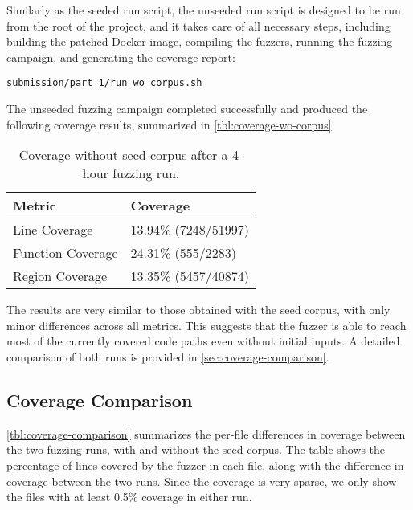 Similarly as the seeded run script, the unseeded run script is designed to be run from the root of the project, and it takes care of all necessary steps, including building the patched Docker image, compiling the fuzzers, running the fuzzing campaign, and generating the coverage report:

\begin{verbatim}
submission/part_1/run_wo_corpus.sh
\end{verbatim}

The unseeded fuzzing campaign completed successfully and produced the following coverage results, summarized in \autoref{tbl:coverage-wo-corpus}.

\begin{table}[ht]
	\centering
	\begin{tabular}{@{}ll@{}}
		\toprule
		\textbf{Metric}   & \textbf{Coverage}    \\
		\midrule
		Line Coverage     & 13.94\% (7248/51997) \\
		Function Coverage & 24.31\% (555/2283)   \\
		Region Coverage   & 13.35\% (5457/40874) \\
		\bottomrule
	\end{tabular}
	\caption{Coverage without seed corpus after a 4-hour fuzzing run.}
	\label{tbl:coverage-wo-corpus}
\end{table}

The results are very similar to those obtained with the seed corpus, with only minor differences across all metrics. This suggests that the fuzzer is able to reach most of the currently covered code paths even without initial inputs. A detailed comparison of both runs is provided in \autoref{sec:coverage-comparison}.

\subsection{Coverage Comparison}
\label{sec:coverage-comparison}

\autoref{tbl:coverage-comparison} summarizes the per-file differences in coverage between the two fuzzing runs, with and without the seed corpus. The table shows the percentage of lines covered by the fuzzer in each file, along with the difference in coverage between the two runs. Since the coverage is very sparse, we only show the files with at least 0.5\% coverage in either run.

